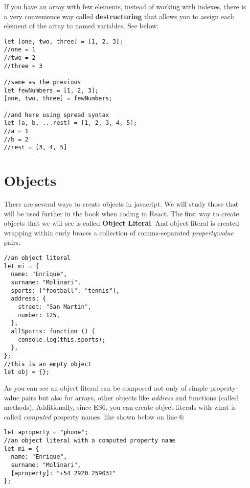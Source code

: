 \documentclass[a4paper, oneside, titlepage, 12pt]{book}
\begin{document}
If you have an array with few elements, instead of working with indexes, there is a very convenience way called \textbf{destructuring} that allows you to assign each element of the array to named variables. See below:

\begin{verbatim}
let [one, two, three] = [1, 2, 3];
//one = 1
//two = 2
//three = 3

//same as the previous
let fewNumbers = [1, 2, 3];
[one, two, three] = fewNumbers;

//and here using spread syntax
let [a, b, ...rest] = [1, 2, 3, 4, 5];
//a = 1
//b = 2
//rest = [3, 4, 5]
\end{verbatim}

\section{Objects}\label{jsobjects}

There are several ways to create objects in javacript. We will study those that will be used further in the book when coding in React. The first way to create objects that we will see is called \textbf{Object Literal}. And object literal is created wrapping within curly braces a collection of comma-separated \textit{property}:\textit{value} pairs. 

\begin{verbatim}
//an object literal
let mi = {
  name: "Enrique",
  surname: "Molinari",
  sports: ["football", "tennis"],
  address: {
    street: "San Martin",
    number: 125,
  },
  allSports: function () {
    console.log(this.sports);
  },
};
//this is an empty object
let obj = {};
\end{verbatim}

As you can see an object literal can be composed not only of simple property-value pairs but also for arrays, other objects like \textit{address} and functions (called methods). Additionally, since ES6, you can create object literals with what is called \textit{computed} property names, like shown below on line 6:

\begin{verbatim}
let aproperty = "phone";               
//an object literal with a computed property name 
let mi = {
  name: "Enrique",
  surname: "Molinari",
  [aproperty]: "+54 2920 259031"
};

\end{verbatim}
\end{document}
